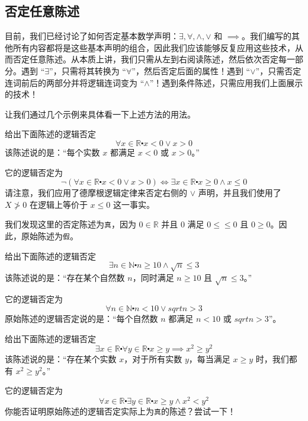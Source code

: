 \subsection{否定任意陈述}

目前，我们已经讨论了如何否定基本数学声明：$\exists, \forall, \land , \lor$ 和 $\implies$。我们编写的其他所有内容都将是这些基本声明的组合，因此我们应该能够反复应用这些技术，从而否定任意陈述。从本质上讲，我们只需从左到右阅读陈述，然后依次否定每一部分。遇到 ``$\exists$''，只需将其转换为 ``$\forall$''，然后否定后面的属性！遇到 ``$\lor$''，只需否定连词前后的两部分并将逻辑连词变为 ``$\land$''！遇到条件陈述，只需应用我们上面展示的技术！

让我们通过几个示例来具体看一下上述方法的用法。\\

\begin{example}
    给出下面陈述的逻辑否定
    \[\forall x \in \mathbb{R} \centerdot x < 0 \lor x > 0\]
    该陈述说的是：``每个实数 $x$ 都满足 $x < 0$ 或 $x > 0$。''

    它的逻辑否定为
    \[\neg (\forall x \in \mathbb{R} \centerdot x < 0 \lor x > 0) \iff \exists x \in \mathbb{R} \centerdot x \ge 0 \land x \le 0\]
    请注意，我们应用了德摩根逻辑定律来否定右侧的 $\lor$ 声明，并且我们使用了 $X \ngtr 0$ 在逻辑上等价于 $x \le 0$ 这一事实。

    我们发现这里的否定陈述为\verb|真|，因为 $0 \in \mathbb{R}$ 并且 $0$ 满足 $0≤ \le 0$ 且 $0 \ge 0$。因此，原始陈述为\verb|假|。
\end{example}

\begin{example}
    给出下面陈述的逻辑否定
    \[\exists n \in \mathbb{N} \centerdot n \ge 10 \land \sqrt{n} \le 3\]
    该陈述说的是：``存在某个自然数 $n$，同时满足 $n \ge 10$ 且 $\sqrt{n} \le 3$。''

    它的逻辑否定为
    \[\forall n \in \mathbb{N} \centerdot n < 10 \lor sqrt{n} > 3\]
    原始陈述的逻辑否定说的是：``每个自然数 $n$ 都满足 $n < 10$ 或 $sqrt{n} > 3$''。
\end{example}

\begin{example}
    给出下面陈述的逻辑否定
    \[\exists x \in \mathbb{R} \centerdot \forall y \in \mathbb{R} \centerdot x \ge y \implies x^2 \ge y^2\]
    该陈述说的是：``存在某个实数 $x$，对于所有实数 $y$，每当满足 $x \ge y$ 时，我们都有 $x^2 \ge y^2$。''

    它的逻辑否定为
    \[\forall x \in \mathbb{R} \centerdot \exists y \in \mathbb{R} \centerdot x \ge y \land x^2 < y^2\]
    你能否证明原始陈述的逻辑否定实际上为\verb|真|的陈述？尝试一下！
\end{example}

